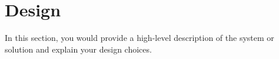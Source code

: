 \section{Design}\label{s:design}

In this section, you would provide a high-level description of the system or
solution and explain your design choices.

\textcolor{lightgray}{\lipsum[22-36]}


